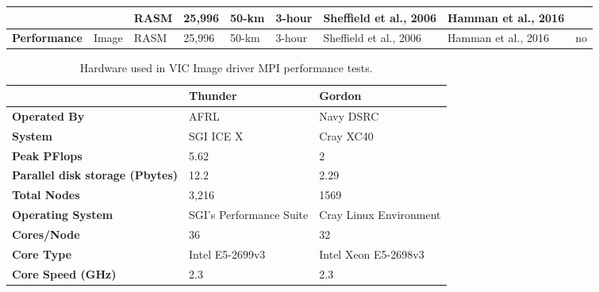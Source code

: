 \documentclass[gmd, manuscript]{copernicus}
\begin{document}
\begin{table}[]
{\begin{tabular}{|l|l|l|l|l|l|l|l|l|}
                                  &                              & RASM            & 25,996              & 50-km               & 3-hour            & Sheffield et al., 2006 & Hamman et al., 2016 &                     \\ \hline
\textbf{Performance}              & Image                        & RASM            & 25,996              & 50-km               & 3-hour            & Sheffield et al., 2006 & Hamman et al., 2016 & no                  \\ \hline
\end{tabular}
}
\end{table}

\clearpage
\begin{table}[]
\centering
\caption{Hardware used in VIC Image driver MPI performance tests.}
\label{table:hardware}
\begin{tabular}{|l|l|l|}
\hline
\textbf{}                                & \textbf{Thunder}                            & \textbf{Gordon}                             \\ \hline
\textbf{Operated By}                     & AFRL                                        & Navy DSRC                                   \\ \hline
\textbf{System}                          & SGI ICE X                                   & Cray XC40                                   \\ \hline
\textbf{Peak PFlops}                     & 5.62                                        & 2                                           \\ \hline
\textbf{Parallel disk storage (Pbytes)}  & 12.2                                        & 2.29                                        \\ \hline
\textbf{Total Nodes}                     & 3,216                                       & 1569                                        \\ \hline
\textbf{Operating System}                & SGI's Performance Suite                     & Cray Linux Environment                      \\ \hline
\textbf{Cores/Node}                      & 36                                          & 32                                          \\ \hline
\textbf{Core Type}                       & Intel E5-2699v3                             & Intel Xeon E5-2698v3                        \\ \hline
\textbf{Core Speed (GHz)}                & 2.3                                         & 2.3                                         \\ \hline

\end{tabular}
\end{table}
\end{document}
